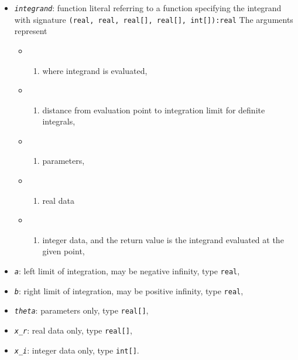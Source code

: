 \documentclass[
  10pt,
]{book}
\providecommand{\tightlist}{%
  \setlength{\itemsep}{0pt}\setlength{\parskip}{0pt}}
\begin{document}
\begin{itemize}
\tightlist
\item
  \emph{\texttt{integrand}}: function literal referring to a function specifying the integrand with signature \texttt{(real,\ real,\ real{[}{]},\ real{[}{]},\ int{[}{]}):real}
  The arguments represent

  \begin{itemize}
  \item
    \begin{enumerate}
    \def\labelenumi{(\arabic{enumi})}
    \tightlist
    \item
      where integrand is evaluated,
    \end{enumerate}
  \item
    \begin{enumerate}
    \def\labelenumi{(\arabic{enumi})}
    \setcounter{enumi}{1}
    \tightlist
    \item
      distance from evaluation point to integration limit for definite integrals,
    \end{enumerate}
  \item
    \begin{enumerate}
    \def\labelenumi{(\arabic{enumi})}
    \setcounter{enumi}{2}
    \tightlist
    \item
      parameters,
    \end{enumerate}
  \item
    \begin{enumerate}
    \def\labelenumi{(\arabic{enumi})}
    \setcounter{enumi}{3}
    \tightlist
    \item
      real data
    \end{enumerate}
  \item
    \begin{enumerate}
    \def\labelenumi{(\arabic{enumi})}
    \setcounter{enumi}{4}
    \tightlist
    \item
      integer data, and the return value is the integrand evaluated at the given point,
    \end{enumerate}
  \end{itemize}
\item
  \emph{\texttt{a}}: left limit of integration, may be negative infinity, type \texttt{real},
\item
  \emph{\texttt{b}}: right limit of integration, may be positive infinity, type \texttt{real},
\item
  \emph{\texttt{theta}}: parameters only, type \texttt{real{[}{]}},
\item
  \emph{\texttt{x\_r}}: real data only, type \texttt{real{[}{]}},
\item
  \emph{\texttt{x\_i}}: integer data only, type \texttt{int{[}{]}}.
\end{itemize}
\end{document}
